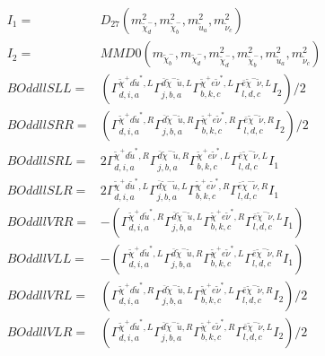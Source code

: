 \documentclass[A4,landscape]{article}
\begin{document}
\begin{align} 
I_1 = & D_{27}(m^2_{\tilde{\chi}^-_{{d}}}, m^2_{\tilde{\chi}^-_{{b}}}, m^2_{\tilde{u}_{{a}}}, m^2_{\tilde{\nu}_{{c}}}) \\ 
I_2 = & MMD0(m_{\tilde{\chi}^-_{{b}}}, m_{\tilde{\chi}^-_{{d}}}, m^2_{\tilde{\chi}^-_{{d}}}, m^2_{\tilde{\chi}^-_{{b}}}, m^2_{\tilde{u}_{{a}}}, m^2_{\tilde{\nu}_{{c}}}) \\ 
  BOddllSLL= & ( \Gamma^{\tilde{\chi}^+d \tilde{u}^*,L}_{d, i, a} \Gamma^{\bar{d}\tilde{\chi}^- \tilde{u} ,L}_{j, b, a} \Gamma^{\tilde{\chi}^+e \tilde{\nu}^*,L}_{b, k, c} \Gamma^{\bar{e}\tilde{\chi}^- \tilde{\nu} ,L}_{l, d, c} I_2)/2 \\ 
  BOddllSRR= & ( \Gamma^{\tilde{\chi}^+d \tilde{u}^*,R}_{d, i, a} \Gamma^{\bar{d}\tilde{\chi}^- \tilde{u} ,R}_{j, b, a} \Gamma^{\tilde{\chi}^+e \tilde{\nu}^*,R}_{b, k, c} \Gamma^{\bar{e}\tilde{\chi}^- \tilde{\nu} ,R}_{l, d, c} I_2)/2 \\ 
  BOddllSRL= & 2  \Gamma^{\tilde{\chi}^+d \tilde{u}^*,R}_{d, i, a} \Gamma^{\bar{d}\tilde{\chi}^- \tilde{u} ,R}_{j, b, a} \Gamma^{\tilde{\chi}^+e \tilde{\nu}^*,L}_{b, k, c} \Gamma^{\bar{e}\tilde{\chi}^- \tilde{\nu} ,L}_{l, d, c} I_1 \\ 
  BOddllSLR= & 2  \Gamma^{\tilde{\chi}^+d \tilde{u}^*,L}_{d, i, a} \Gamma^{\bar{d}\tilde{\chi}^- \tilde{u} ,L}_{j, b, a} \Gamma^{\tilde{\chi}^+e \tilde{\nu}^*,R}_{b, k, c} \Gamma^{\bar{e}\tilde{\chi}^- \tilde{\nu} ,R}_{l, d, c} I_1 \\ 
  BOddllVRR= & -( \Gamma^{\tilde{\chi}^+d \tilde{u}^*,R}_{d, i, a} \Gamma^{\bar{d}\tilde{\chi}^- \tilde{u} ,L}_{j, b, a} \Gamma^{\tilde{\chi}^+e \tilde{\nu}^*,R}_{b, k, c} \Gamma^{\bar{e}\tilde{\chi}^- \tilde{\nu} ,L}_{l, d, c} I_1) \\ 
  BOddllVLL= & -( \Gamma^{\tilde{\chi}^+d \tilde{u}^*,L}_{d, i, a} \Gamma^{\bar{d}\tilde{\chi}^- \tilde{u} ,R}_{j, b, a} \Gamma^{\tilde{\chi}^+e \tilde{\nu}^*,L}_{b, k, c} \Gamma^{\bar{e}\tilde{\chi}^- \tilde{\nu} ,R}_{l, d, c} I_1) \\ 
  BOddllVRL= & ( \Gamma^{\tilde{\chi}^+d \tilde{u}^*,R}_{d, i, a} \Gamma^{\bar{d}\tilde{\chi}^- \tilde{u} ,L}_{j, b, a} \Gamma^{\tilde{\chi}^+e \tilde{\nu}^*,L}_{b, k, c} \Gamma^{\bar{e}\tilde{\chi}^- \tilde{\nu} ,R}_{l, d, c} I_2)/2 \\ 
  BOddllVLR= & ( \Gamma^{\tilde{\chi}^+d \tilde{u}^*,L}_{d, i, a} \Gamma^{\bar{d}\tilde{\chi}^- \tilde{u} ,R}_{j, b, a} \Gamma^{\tilde{\chi}^+e \tilde{\nu}^*,R}_{b, k, c} \Gamma^{\bar{e}\tilde{\chi}^- \tilde{\nu} ,L}_{l, d, c} I_2)/2 \\ 

\end{align}
\end{document}
